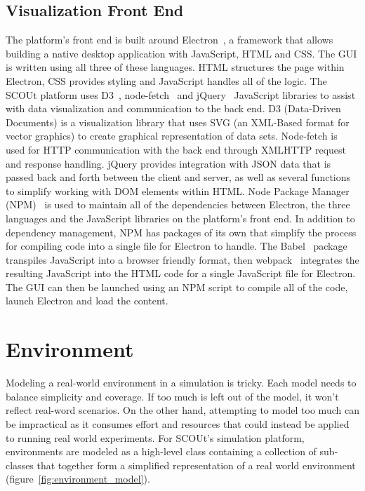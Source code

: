 \subsection{Visualization Front End} \label{subsec:front_end}
The platform's front end is built around Electron~\cite{electron}, a framework that allows building a native desktop application with JavaScript, HTML and CSS.
The GUI is written using all three of these languages.
HTML structures the page within Electron, CSS provides styling and JavaScript handles all of the logic.
The SCOUt platform uses D3~\cite{d3}, node-fetch~\cite{node-fetch} and jQuery~\cite{jquery} JavaScript libraries to assist with data visualization and communication to the back end.
D3 (Data-Driven Documents) is a visualization library that uses SVG (an XML-Based format for vector graphics) to create graphical representation of data sets.
Node-fetch is used for HTTP communication with the back end through XMLHTTP request and response handling.
jQuery provides integration with JSON data that is passed back and forth between the client and server, as well as several functions to simplify working with DOM elements within HTML.
Node Package Manager (NPM)~\cite{npm} is used to maintain all of the dependencies between Electron, the three languages and the JavaScript libraries on the platform's front end.
In addition to dependency management, NPM has packages of its own that simplify the process for compiling code into a single file for Electron to handle.
The Babel~\cite{babel} package transpiles JavaScript into a browser friendly format, then webpack~\cite{webpack} integrates the resulting JavaScript into the HTML code for a single JavaScript file for Electron.
The GUI can then be launched using an NPM script to compile all of the code, launch Electron and load the content.



\section{Environment} \label{sec:environment}
Modeling a real-world environment in a simulation is tricky.
Each model needs to balance simplicity and coverage.
If too much is left out of the model, it won’t reflect real-word scenarios.
On the other hand, attempting to model too much can be impractical as it consumes effort and resources that could instead be applied to running real world experiments.
For SCOUt's simulation platform, environments are modeled as a high-level class containing a collection of sub-classes that together form a simplified representation of a real world environment (figure~\ref{fig:environment_model}).

